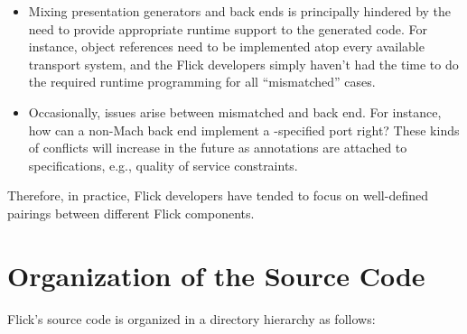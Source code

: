 \begin{description}
\begin{itemize}
    \item Mixing presentation generators and back ends is principally hindered
    by the need to provide appropriate runtime support to the generated code.
    For instance, \CORBA{} object references need to be implemented atop every
    available transport system, and the Flick developers simply haven't had the
    time to do the required runtime programming for all ``mismatched'' cases.

    \item Occasionally, issues arise between mismatched \IDL{} and back end.
    For instance, how can a non-Mach back end implement a \MIG{}
    \IDL{}-specified port right?  These kinds of conflicts will increase in the
    future as annotations are attached to \IDL{} specifications, e.g., quality
    of service constraints.
  \end{itemize}
  Therefore, in practice, Flick developers have tended to focus on well-defined
  pairings between different Flick components.
\end{description}



\section{Organization of the Source Code}
\label{sec:Coding:Organization of the Source Code}

Flick's source code is organized in a directory hierarchy as follows:

